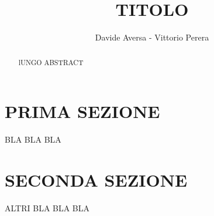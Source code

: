 \documentclass[a4paper,10pt]{article}
\title{TITOLO}
\author{Davide Aversa - Vittorio Perera}
\begin{document}
\maketitle

\begin{abstract}

lUNGO ABSTRACT

\end{abstract}

\section{PRIMA SEZIONE}

BLA BLA BLA
\section{SECONDA SEZIONE}

ALTRI BLA BLA BLA



\end{document}

